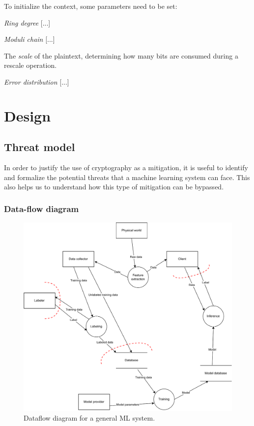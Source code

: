 \documentclass[a4paper,11pt,oneside]{report}
\begin{document}
To initialize the context, some parameters need to be set:

\emph{Ring degree} [...]

\emph{Moduli chain} [...]

The \emph{scale} of the plaintext, determining how many bits are consumed during a rescale operation.

\emph{Error distribution} [...]



\chapter{Design}



\section{Threat model}

In order to justify the use of cryptography as a mitigation, it is useful to identify and formalize the potential threats that a machine learning system can face. This also helps us to understand how this type of mitigation can be bypassed.

\subsection{Data-flow diagram}

\begin{figure}[t]
    \centering
    \includegraphics[width=\textwidth]{figures/dataflow-ml.pdf}
    \caption{Dataflow diagram for a general ML system.}
    \label{fig:dataflow}
\end{figure}
\end{document}
